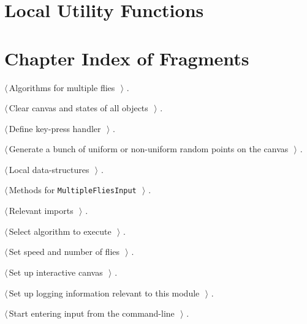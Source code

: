 \documentclass[11.5pt]{report}
\begin{document}
\needspace{17cm}
\section{Local Utility Functions}
\blindtext
\section{Chapter Index of Fragments}

{\small\begin{list}{}{\setlength{\itemsep}{-\parsep}\setlength{\itemindent}{-\leftmargin}}
\item $\langle\,$Algorithms for multiple flies\nobreak\ {\footnotesize {}}$\,\rangle$ {\footnotesize {\NWtxtRefIn} .}
\item $\langle\,$Clear canvas and states of all objects\nobreak\ {\footnotesize {}}$\,\rangle$ {\footnotesize {\NWtxtRefIn} .}
\item $\langle\,$Define key-press handler\nobreak\ {\footnotesize {}}$\,\rangle$ {\footnotesize {\NWtxtRefIn} .}
\item $\langle\,$Generate a bunch of uniform or non-uniform random points on the canvas\nobreak\ {\footnotesize {}}$\,\rangle$ {\footnotesize {\NWtxtRefIn} .}
\item $\langle\,$Local data-structures\nobreak\ {\footnotesize {}}$\,\rangle$ {\footnotesize {\NWtxtRefIn} .}
\item $\langle\,$Methods for \verb|MultipleFliesInput|\nobreak\ {\footnotesize {}}$\,\rangle$ {\footnotesize {\NWtxtRefIn} .}
\item $\langle\,$Relevant imports\nobreak\ {\footnotesize {}}$\,\rangle$ {\footnotesize {\NWtxtRefIn} .}
\item $\langle\,$Select algorithm to execute\nobreak\ {\footnotesize {}}$\,\rangle$ {\footnotesize {\NWtxtRefIn} .}
\item $\langle\,$Set speed and number of flies\nobreak\ {\footnotesize {}}$\,\rangle$ {\footnotesize {\NWtxtRefIn} .}
\item $\langle\,$Set up interactive canvas\nobreak\ {\footnotesize {}}$\,\rangle$ {\footnotesize {\NWtxtRefIn} .}
\item $\langle\,$Set up logging information relevant to this module\nobreak\ {\footnotesize {}}$\,\rangle$ {\footnotesize {\NWtxtRefIn} .}
\item $\langle\,$Start entering input from the command-line\nobreak\ {\footnotesize {}}$\,\rangle$ {\footnotesize {\NWtxtRefIn} .}
\end{list}}
\end{document}
